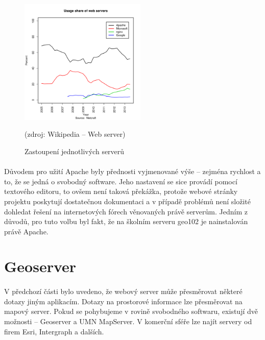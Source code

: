 \documentclass[11pt,a4paper,titlepage,oneside]{book}
\begin{document}

		\begin{figure}[!h]
			\begin{center}
				\includegraphics[width=6cm]{obrazky/servers_share.png}
				\caption{Zastoupení jednotlivých serverů}
				(zdroj: Wikipedia -- Web server\cite{wiki_webServer})
			\end{center}
		\end{figure}

		\paragraph{} Důvodem pro užití Apache byly přednosti vyjmenované výše -- zejména rychlost a to, že se jedná o svobodný software. Jeho nastavení se sice provádí pomocí textového editoru, to ovšem není taková překážka, protože webové stránky projektu poskytují dostatečnou dokumentaci a v případě problémů není složité dohledat řešení na internetových fórech věnovaných právě serverům. Jedním z důvodů, pro tuto volbu byl fakt, že na školním serveru geo102 je nainstalován právě Apache.

	\section{Geoserver}
		\paragraph{} V předchozí části bylo uvedeno, že webový server může přesměrovat některé dotazy jiným aplikacím. Dotazy na prostorové informace lze přesměrovat na mapový server. Pokud se pohybujeme v rovině svobodného softwaru, existují dvě možnosti -- Geoserver a UMN MapServer. V komerční sféře lze najít servery od firem Esri, Intergraph a dalších. 

\end{document}
